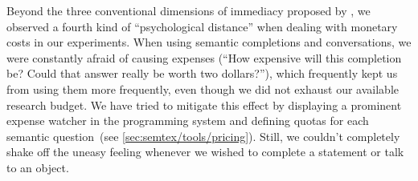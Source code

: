 Beyond the three conventional dimensions of immediacy proposed by \cite{ungar1997debugging}, we observed a fourth kind of ``psychological distance'' when dealing with monetary costs in our experiments.
When using semantic completions and conversations, we were constantly afraid of causing expenses (``How expensive will this completion be? Could that answer really be worth two dollars?''), which frequently kept us from using them more frequently, even though we did not exhaust our available research budget.
We have tried to mitigate this effect by displaying a prominent expense watcher in the programming system and defining quotas for each semantic question~(see \cref{sec:semtex/tools/pricing}).
Still, we couldn't completely shake off the uneasy feeling whenever we wished to complete a statement or talk to an object.
